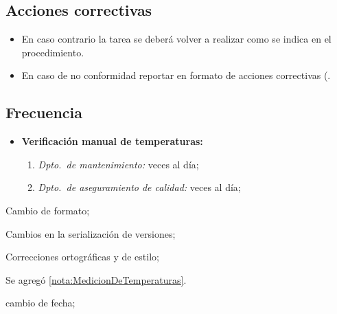\subsection{Acciones correctivas}

\begin{itemize}
	\item En caso contrario la tarea se deberá volver a realizar como se indica en el procedimiento.
	\item En caso de no conformidad reportar en formato de acciones correctivas (\RAC.
\end{itemize}

\subsection{Frecuencia}

\begin{itemize}
	\item \textbf{Verificación manual de temperaturas:}
		\begin{enumerate}
			\item \emph{Dpto.\ de mantenimiento:} \VecesTempManual veces al día;
			\item \emph{Dpto.\ de aseguramiento de calidad:} \VecesTempManual veces al día;
		\end{enumerate}
\end{itemize}

\begin{changelog}[simple, sectioncmd=\subsection*,label=changelog-\thesection-\MayorVer.\MenorVer]

	\begin{version}[v=2.1, date=2023--01, author=Pablo E. Alanis]
		\item Cambio de formato;
		\item Cambios en la serialización de versiones;
		\item Correcciones ortográficas y de estilo;
		\item Se agregó \cref{nota:MedicionDeTemperaturas}.
	\end{version}

	\begin{version}[v=1.8, date=2022--05, author=Alonso M.]
		\item cambio de fecha;
	\end{version}

\end{changelog}